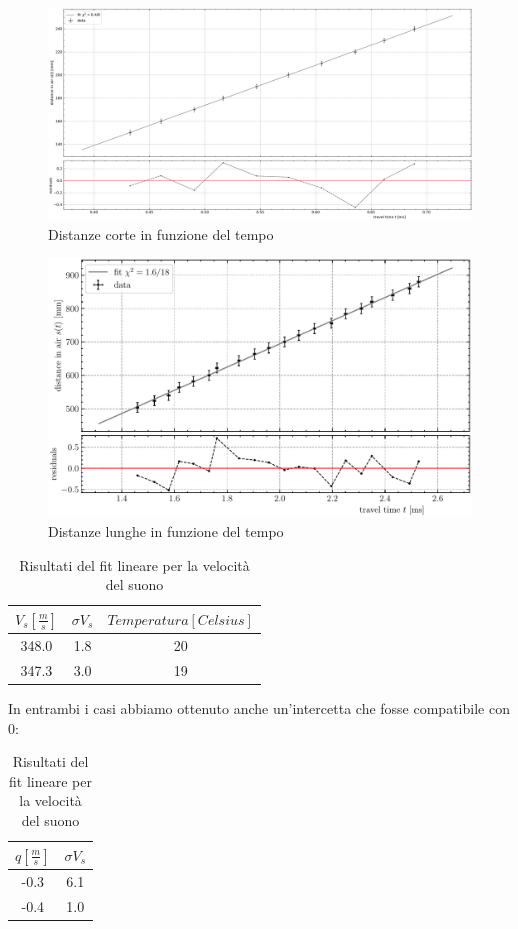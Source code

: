 \documentclass[10pt, a4paper, italian]{article}
\begin{document}
\begin{figure}[H]
    \centering
	\includegraphics[scale=0.3]{2}
    \caption{Distanze corte in funzione del tempo}
\end{figure}
\begin{figure}[H]
    \centering
	\includegraphics[scale=0.7]{railtime}
    \caption{Distanze lunghe in funzione del tempo}
\end{figure}
\begin{table}[H]
\centering
\begin{tabular}{cc|c}
\toprule
$V_s [\frac{m}{s}]$& $\sigma V_s$ & $Temperatura [Celsius]$ \\
\midrule
348.0 & 1.8 & 20\\
347.3 & 3.0 & 19\\
\bottomrule
\end{tabular}
\caption{Risultati del fit lineare per la velocità del suono}
\end{table}
In entrambi i casi abbiamo ottenuto anche un'intercetta che fosse compatibile con 0:
\begin{table}[H]
\centering
\begin{tabular}{cc}
\toprule
$q [\frac{m}{s}]$& $\sigma V_s$ \\
\midrule
-0.3 & 6.1 \\
-0.4 & 1.0 \\
\bottomrule
\end{tabular}
\caption{Risultati del fit lineare per la velocità del suono}
\end{table}
\end{document}

